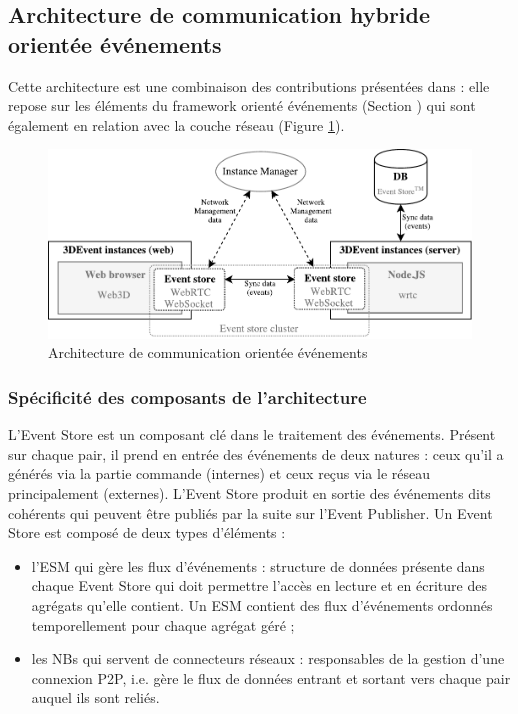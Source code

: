 \subsection{Architecture de communication hybride \og orientée 
événements\fg{}}
\label{sec:comm_event}

Cette architecture est une combinaison des contributions présentées dans 
\cite{Desprat2016,Desprat2017} : elle repose sur les éléments du 
framework orienté événements (Section ) qui sont également 
en relation avec la couche réseau (Figure \ref{fig:archievent}).
\begin{figure}[ht]
	\centering
	\includegraphics[width=\columnwidth]{eps/archi.pdf}
	\caption{Architecture de communication \og orientée événements\fg{}}
	\label{fig:archievent}
\end{figure}

\subsubsection{Spécificité des composants de l'architecture}
L'Event Store est un composant clé dans le traitement des événements. Présent 
sur chaque pair, il prend en entrée des événements de deux natures : ceux qu'il a 
générés via la partie commande (internes) et ceux reçus via le réseau 
principalement (externes). 
L'Event Store produit en sortie des événements dits \og 
cohérents\fg{} qui peuvent être publiés par la suite sur l'Event Publisher.
Un Event Store est composé de deux types d'éléments : 
\begin{itemize}
	\item l'\gls{ESM} qui gère les flux d'événements : structure de données 
	présente dans chaque Event Store qui doit permettre l'accès en lecture et en 
	écriture des agrégats qu'elle contient. 
	Un \gls{ESM} contient des flux d'événements ordonnés temporellement 
	pour chaque agrégat géré ;
	\item les \glspl{NB} qui servent de connecteurs réseaux : responsables de la 
	gestion d'une connexion \gls{P2P}, i.e. gère le flux de données entrant et 
	sortant vers chaque pair auquel ils sont reliés.
\end{itemize}

